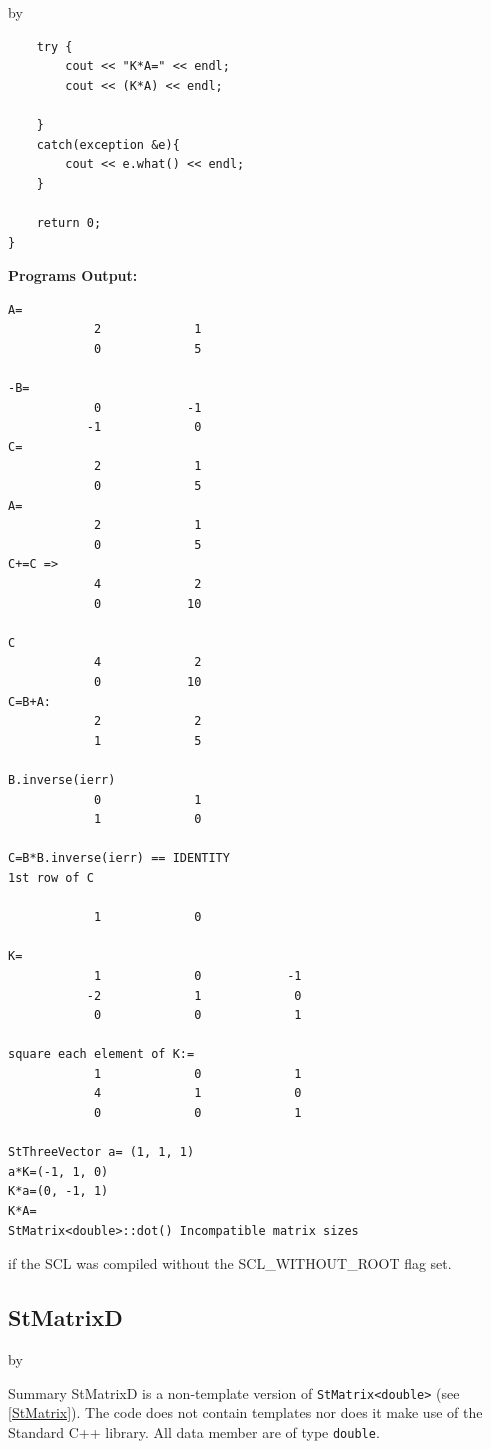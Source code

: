 \documentclass[twoside]{article}
\newcommand{\name}[1]{\textsf{#1}}%
\newcommand{\entrylabel}[1]{\mbox{\textbf{{#1}}}\hfil}%
\newenvironment{entry}
{\begin{list}{}%
    {\renewcommand{\makelabel}{\entrylabel}%
     \setlength{\labelwidth}{90pt}%
     \setlength{\leftmargin}{\labelwidth}
     \advance\leftmargin by \labelsep%
      }%
    }%
  {\end{list}}
\newcommand{\Entrylabel}[1]%
{\raisebox{0pt}[1ex][0pt]{\makebox[\labelwidth][l]%
    {\parbox[t]{\labelwidth}{\hspace{0pt}\textbf{{#1}}}}}}
\newenvironment{Entry}%
{\renewcommand{\entrylabel}{\Entrylabel}\begin{entry}}%
  {\end{entry}}
\begin{document}
\begin{description}
\begin{Entry}
{\begin{verbatim}
    try {
        cout << "K*A=" << endl;
        cout << (K*A) << endl;
        
    }
    catch(exception &e){
        cout << e.what() << endl;
    }

    return 0;
}
\end{verbatim}
}%
{\bf Programs Output:}
{\footnotesize
\begin{verbatim}
A=
            2             1 
            0             5 

-B=
            0            -1 
           -1             0 
C=
            2             1 
            0             5 
A=
            2             1 
            0             5 
C+=C =>
            4             2 
            0            10 

C 
            4             2 
            0            10 
C=B+A:
            2             2 
            1             5 

B.inverse(ierr)
            0             1 
            1             0 

C=B*B.inverse(ierr) == IDENTITY
1st row of C

            1             0 

K=
            1             0            -1 
           -2             1             0 
            0             0             1 

square each element of K:=
            1             0             1 
            4             1             0 
            0             0             1 

StThreeVector a= (1, 1, 1)
a*K=(-1, 1, 0)
K*a=(0, -1, 1)
K*A=
StMatrix<double>::dot() Incompatible matrix sizes
\end{verbatim}
} %
\end{Entry}

\clearpage

%
    if the SCL was compiled without the \name{SCL\_WITHOUT\_ROOT} flag set.
\subsection{StMatrixD } \label{StMatrixD}
\begin{Entry}
\item[Summary]
    StMatrixD is a non-template version of \verb+StMatrix<double>+
    (see \ref{StMatrix}). The code does not contain templates nor
    does it make use of the Standard C++ library. All data member are of
    type \texttt{double}.
    

\end{Entry}
\end{description}
\end{document}
